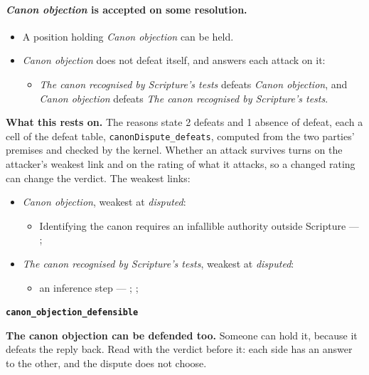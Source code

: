 \documentclass[11pt]{article}
\begin{document}
\paragraph{\emph{Canon objection} is accepted on some resolution.}
\begin{itemize}
\item A position holding \emph{Canon objection} can be held.
\item \emph{Canon objection} does not defeat itself, and answers each attack on it:
\begin{itemize}
\item \emph{The canon recognised by Scripture’s tests} defeats \emph{Canon objection}, and \emph{Canon objection} defeats \emph{The canon recognised by Scripture’s tests}.
\end{itemize}
\end{itemize}
\par\noindent\textbf{What this rests on.} The reasons state 2 defeats and 1 absence of defeat, each a cell of the defeat table, \texttt{canon\allowbreak{}Dispute\_\allowbreak{}defeats}, computed from the two parties' premises and checked by the kernel. Whether an attack survives turns on the attacker's weakest link and on the rating of what it attacks, so a changed rating can change the verdict. The weakest links:
\begin{itemize}
\item \emph{Canon objection}, weakest at \emph{disputed}:
\begin{itemize}
\item Identifying the canon requires an infallible authority outside Scripture --- \cite[Trent, Session IV (1546), Decree on Sacred Books and Traditions]{tanner-decrees-1990}; \cite[The criterion of inspiration]{reid-canon-new-testament-1908}
\end{itemize}
\item \emph{The canon recognised by Scripture’s tests}, weakest at \emph{disputed}:
\begin{itemize}
\item an inference step --- \cite[The criterion of inspiration]{reid-canon-new-testament-1908}; \cite[67--87]{kruger-canon-revisited-2012}; \cite[127--129]{mcdonald-integrity-biblical-canon-1996}
\end{itemize}
\end{itemize}
\par\medskip\noindent\textbf{\texttt{canon\_\allowbreak{}objection\_\allowbreak{}defensible}}\par\nobreak\noindent
\textbf{The canon objection can be defended too.} Someone can hold it, because it defeats the reply back. Read with the verdict before it: each side has an answer to the other, and the dispute does not choose.
\end{document}
